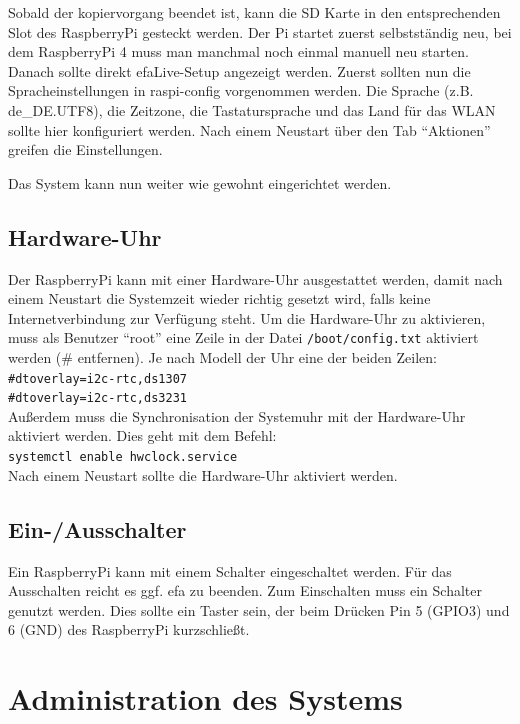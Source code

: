 \documentclass[a4paper,12pt,twoside]{article}
\begin{document}
Sobald der kopiervorgang beendet ist, kann die SD Karte in den entsprechenden Slot
des RaspberryPi gesteckt werden. Der Pi startet zuerst selbstständig neu, bei dem RaspberryPi 4 muss man manchmal
noch einmal manuell neu starten. Danach sollte direkt efaLive-Setup angezeigt werden. Zuerst sollten nun die 
Spracheinstellungen in raspi-config vorgenommen werden. Die Sprache (z.B. de\_DE.UTF8), die Zeitzone, 
die Tastatursprache und das Land für das WLAN sollte hier konfiguriert werden. Nach einem Neustart über den Tab "`Aktionen"' greifen die Einstellungen.

Das System kann nun weiter wie gewohnt eingerichtet werden.


\subsection{Hardware-Uhr}
\label{sct:raspi_hardware_clock}
Der RaspberryPi kann mit einer Hardware-Uhr ausgestattet werden, damit nach einem Neustart die
Systemzeit wieder richtig gesetzt wird, falls keine Internetverbindung zur Verfügung steht. Um
die Hardware-Uhr zu aktivieren, muss als Benutzer "`root"' eine Zeile in der Datei \texttt{/boot/config.txt} aktiviert
werden (\# entfernen). Je nach Modell der Uhr eine der beiden Zeilen:
\bigskip
\\
\texttt{\#dtoverlay=i2c-rtc,ds1307\\
\#dtoverlay=i2c-rtc,ds3231}
\bigskip
\\
Außerdem muss die Synchronisation der Systemuhr mit der Hardware-Uhr aktiviert werden. Dies geht mit
dem Befehl:
\bigskip
\\
\texttt{systemctl enable hwclock.service}
\bigskip
\\
Nach einem Neustart sollte die Hardware-Uhr aktiviert werden.


\subsection{Ein-/Ausschalter}
\label{sct:raspi_power_button}
Ein RaspberryPi kann mit einem Schalter eingeschaltet werden. Für das Ausschalten reicht es ggf. efa
zu beenden. Zum Einschalten muss ein Schalter genutzt werden. Dies sollte ein Taster sein, der beim Drücken Pin
5 (GPIO3) und 6 (GND) des RaspberryPi kurzschließt.


\section{Administration des Systems}
\label{sct:administration}
\end{document}
